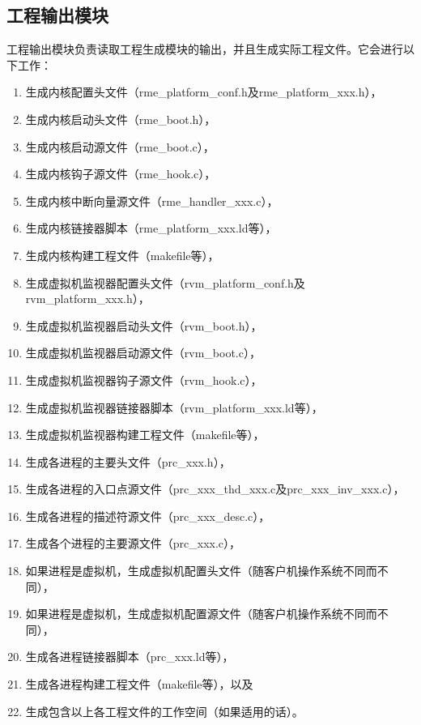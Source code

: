 \subsection{工程输出模块}\label{subsec:5-1-3}

工程输出模块负责读取工程生成模块的输出，并且生成实际工程文件。它会进行以下工作：

\begin{enumerate}
\def\labelenumi{\arabic{enumi}.}
\item
  生成内核配置头文件（rme\_platform\_conf.h及rme\_platform\_xxx.h），
\item
  生成内核启动头文件（rme\_boot.h），
\item
  生成内核启动源文件（rme\_boot.c），
\item
  生成内核钩子源文件（rme\_hook.c），
\item
  生成内核中断向量源文件（rme\_handler\_xxx.c），
\item
  生成内核链接器脚本（rme\_platform\_xxx.ld等），
\item
  生成内核构建工程文件（makefile等），
\item
  生成虚拟机监视器配置头文件（rvm\_platform\_conf.h及rvm\_platform\_xxx.h），
\item
  生成虚拟机监视器启动头文件（rvm\_boot.h），
\item
  生成虚拟机监视器启动源文件（rvm\_boot.c），
\item
  生成虚拟机监视器钩子源文件（rvm\_hook.c），
\item
  生成虚拟机监视器链接器脚本（rvm\_platform\_xxx.ld等），
\item
  生成虚拟机监视器构建工程文件（makefile等），
\item
  生成各进程的主要头文件（prc\_xxx.h），
\item
  生成各进程的入口点源文件（prc\_xxx\_thd\_xxx.c及prc\_xxx\_inv\_xxx.c），
\item
  生成各进程的描述符源文件（prc\_xxx\_desc.c），
\item
  生成各个进程的主要源文件（prc\_xxx.c），
\item
  如果进程是虚拟机，生成虚拟机配置头文件（随客户机操作系统不同而不同），
\item
  如果进程是虚拟机，生成虚拟机配置源文件（随客户机操作系统不同而不同），
\item
  生成各进程链接器脚本（prc\_xxx.ld等），
\item
  生成各进程构建工程文件（makefile等），以及
\item
  生成包含以上各工程文件的工作空间（如果适用的话）。
\end{enumerate}

